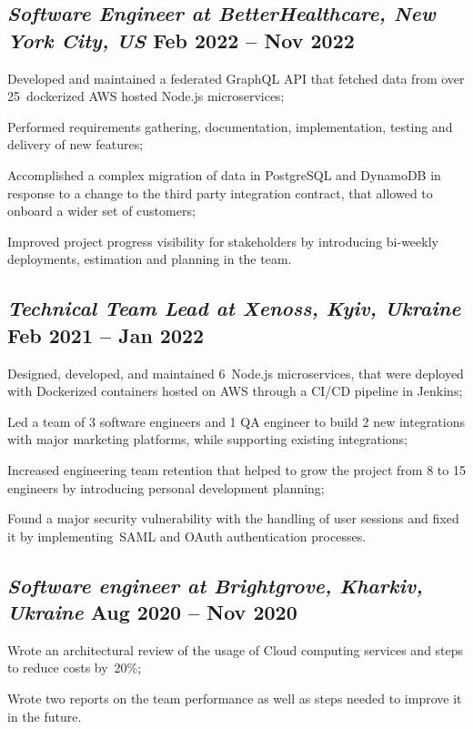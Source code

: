\documentclass[a4paper,12pt]{book}
\begin{document}
\subsection{{\sl\bf\hspace{0.1in}Software Engineer at BetterHealthcare,  New York City, US} \hfill Feb 2022 -- Nov 2022}
\begin{zitemize}
\item Developed and maintained a federated GraphQL API that fetched data from over 25~dockerized AWS hosted Node.js microservices;
\item Performed requirements gathering, documentation, implementation, testing and delivery of new features;
\item Accomplished a complex migration of data in PostgreSQL and DynamoDB in response to a change to the third party integration contract, that allowed to onboard a wider set of customers; 
\item Improved project progress visibility for stakeholders by introducing bi-weekly deployments, estimation and planning in the team.
\end{zitemize}

\subsection{{\sl\bf\hspace{0.1in}Technical Team Lead at Xenoss, Kyiv, Ukraine } \hfill Feb 2021 -- Jan 2022}
\begin{zitemize}
 \item Designed, developed, and maintained 6~Node.js microservices, that were deployed with Dockerized containers hosted on AWS through a CI/CD pipeline in Jenkins;
 \item Led a team of 3 software engineers and 1 QA engineer to build 2 new integrations with major marketing platforms, while supporting existing integrations;
 \item Increased engineering team retention that helped to grow the project from 8 to 15 engineers by introducing personal development planning;
 \item Found a major security vulnerability with the handling of user sessions and fixed it by implementing~SAML and OAuth authentication processes.
\end{zitemize}

\subsection{{\sl\bf\hspace{0.1in}Software engineer at Brightgrove, Kharkiv, Ukraine } \hfill Aug 2020 -- Nov 2020}
\begin{zitemize}
 \item Wrote an architectural review of the usage of Cloud computing services and steps to reduce costs by~20\%;
 \item Wrote two reports on the team performance as well as steps needed to improve it in the future.
\end{zitemize}
\end{document}
